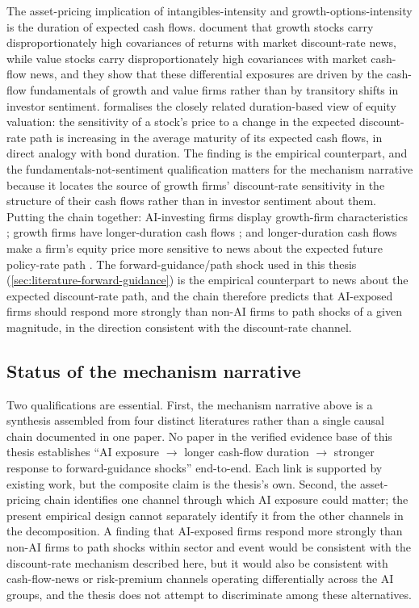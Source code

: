 The asset-pricing implication of intangibles-intensity and
growth-options-intensity is the duration of expected cash flows.
 document that growth stocks
carry disproportionately high covariances of returns with market
discount-rate news, while value stocks carry disproportionately
high covariances with market cash-flow news, and they show that
these differential exposures are driven by the cash-flow
fundamentals of growth and value firms rather than by transitory
shifts in investor sentiment.  formalises
the closely related duration-based view of equity valuation: the
sensitivity of a stock's price to a change in the expected
discount-rate path is increasing in the average maturity of its
expected cash flows, in direct analogy with bond duration. The
\citet{campbellPolkVuolteenaho2010} finding is the empirical
counterpart, and the fundamentals-not-sentiment qualification
matters for the mechanism narrative because it locates the source
of growth firms' discount-rate sensitivity in the structure of
their cash flows rather than in investor sentiment about them. 
Putting the chain together: AI-investing firms display
growth-firm characteristics \citep{babinaEtAl2024,babinaEtAlSystematicRisk};
growth firms have longer-duration cash flows
\citep{campbellPolkVuolteenaho2010,vanBinsbergen2020}; and
longer-duration cash flows make a firm's equity price more sensitive
to news about the expected future policy-rate path
\citep{vanBinsbergen2020}. The forward-guidance/path shock used in
this thesis (\cref{sec:literature-forward-guidance}) is the empirical
counterpart to news about the expected discount-rate path, and the
chain therefore predicts that AI-exposed firms should respond more
strongly than non-AI firms to path shocks of a given magnitude, in
the direction consistent with the discount-rate channel.

\subsection*{Status of the mechanism narrative}

Two qualifications are essential. First, the mechanism narrative
above is a synthesis assembled from four distinct literatures rather
than a single causal chain documented in one paper. No paper in the
verified evidence base of this thesis establishes ``AI exposure $\rightarrow$
longer cash-flow duration $\rightarrow$ stronger response to
forward-guidance shocks'' end-to-end. Each link is supported by
existing work, but the composite claim is the thesis's own. Second,
the asset-pricing chain identifies one channel through which AI
exposure could matter; the present empirical design cannot separately
identify it from the other channels in the \citet{campbellAmmer1993}
decomposition. A finding that AI-exposed firms respond more strongly
than non-AI firms to path shocks within sector and event would be
consistent with the discount-rate mechanism described here, but it
would also be consistent with cash-flow-news or risk-premium channels
operating differentially across the AI groups, and the thesis does
not attempt to discriminate among these alternatives.

